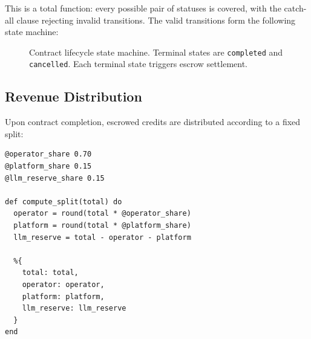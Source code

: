 \documentclass[12pt,a4paper]{article}
\theoremstyle{plain}
\theoremstyle{definition}
\begin{document}
This is a total function: every possible pair of statuses is covered, with the catch-all clause rejecting invalid transitions. The valid transitions form the following state machine:

\begin{figure}[H]
\centering
{}
\caption{Contract lifecycle state machine. Terminal states are \texttt{completed} and \texttt{cancelled}. Each terminal state triggers escrow settlement.}
\label{fig:contract-lifecycle}
\end{figure}

\subsection{Revenue Distribution}

Upon contract completion, escrowed credits are distributed according to a fixed split:

\begin{lstlisting}[caption={Revenue split computation},label={lst:market-split}]
@operator_share 0.70
@platform_share 0.15
@llm_reserve_share 0.15

def compute_split(total) do
  operator = round(total * @operator_share)
  platform = round(total * @platform_share)
  llm_reserve = total - operator - platform

  %{
    total: total,
    operator: operator,
    platform: platform,
    llm_reserve: llm_reserve
  }
end
\end{lstlisting}
\end{document}
